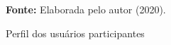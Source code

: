 \begin{figure}[ht!]
\centering

\caption{\textmd{Perfil dos usuários participantes}}
\label{fig:perfilusuarios}

\par\medskip\textbf{Fonte:} Elaborada pelo autor (2020). \par\medskip

\end{figure}
